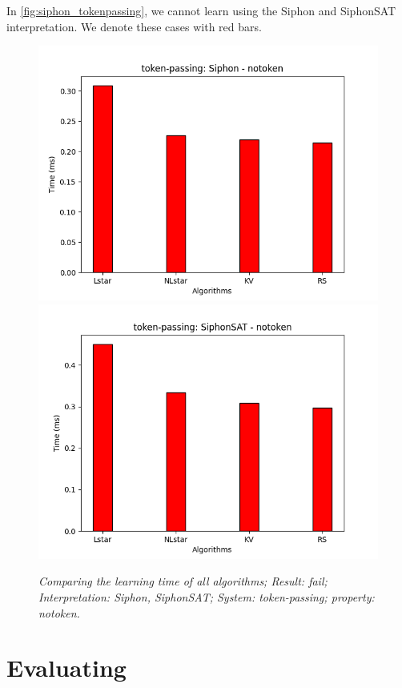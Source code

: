 In \autoref{fig:siphon_tokenpassing}, we cannot learn using the Siphon and SiphonSAT interpretation. We denote these cases with red bars.
\begin{figure}[h]
    \includegraphics[scale=0.5]{figures/Siphon_notoken.png}
    \includegraphics[scale=0.5]{figures/SiphonSAT_notoken.png}
    \caption{\textit{Comparing the learning time of all algorithms; Result: fail; Interpretation: Siphon, SiphonSAT; System: token-passing; property: notoken.}}
    \label{fig:siphon_tokenpassing}
\end{figure}

\section{Evaluating}

